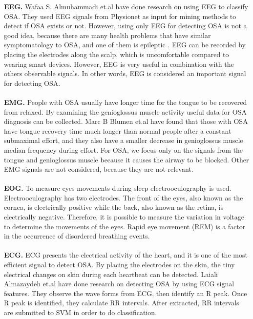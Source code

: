     \textbf{EEG. } Wafaa S. Almuhammadi et.al\cite{IEEEOSAEEG} have done research on using EEG to classify OSA. They used EEG signals from Physionet as input for mining methods to detect if OSA exists or not. However, using only EEG for detecting OSA is not a good idea, because there are many health problems that have similar symptomatology to OSA, and one of them is epileptic \cite{NCBIEGEPILEPSY}. EEG can be recorded by placing the electrodes along the scalp, which is uncomfortable compared to wearing smart devices. However, EEG is very useful in combination with the others observable signals. In other words, EEG is considered an important signal for detecting OSA.\\\\
    \textbf{EMG. }People with OSA usually have longer time for the tongue to be recovered from relaxed. By examining the genioglossus muscle activity useful data for OSA diagnosis can be collected. Marc B Blumen et.al \cite{SDEMG} have found that those with OSA have tongue recovery time much longer than normal people after a constant submaximal effort, and they also have a smaller decrease in genioglossus muscle median frequency during effort. For OSA, we focus only on the signals from the tongue and genioglossus muscle because it causes the airway to be blocked. Other EMG signals are not considered, because they are not relevant.\\\\
    \textbf{EOG. }To measure eyes movements during sleep electrooculography is used. Electrooculography has two electrodes. The front of the eyes, also known as the cornea, is electrically positive while the back, also known as the retina, is electrically negative. Therefore, it is possible to measure the variation in voltage to determine the movements of the eyes. Rapid eye movement (REM) is a factor in the occurrence of disordered breathing events\cite{JSREM}. \\\\
    \textbf{ECG. } ECG presents the electrical activity of the heart, and it is one of the most efficient signal to detect OSA. By placing the electrodes on the skin, the tiny electrical changes on skin during each heartbeat can be detected. Laiali Almazaydeh et.al \cite{RESEARCHGATE} have done research on detecting OSA by using ECG signal features. They observe the wave forms from ECG, then identify an R peak. Once R peak is identified, they calculate RR intervals. After extracted, RR intervals are submitted to SVM in order to do classification.\\\\
